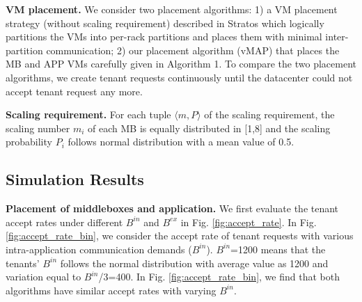 \documentclass[review]{elsarticle}
\begin{document}
\textbf{VM placement.} We consider two placement algorithms: 1) a VM placement strategy (without scaling requirement) described in Stratos \cite{stratos12} which logically partitions the VMs into per-rack partitions and places them with minimal inter-partition communication; 2) our placement algorithm (vMAP) that places the MB and APP VMs carefully given in Algorithm 1. To compare the two placement algorithms, we create tenant requests continuously until the datacenter could not accept tenant request any more.

\textbf{Scaling requirement.} For each tuple $\langle m, P\rangle$ of the scaling requirement, the scaling number $m_i$ of each MB is equally distributed in [1,8] and the scaling probability $P_i$ follows normal distribution with a mean value of 0.5. 
\subsection{Simulation Results}
\textbf{Placement of middleboxes and application.} We first evaluate the tenant accept rates under different $B^{in}$ and $B^{ex}$ in Fig. \ref{fig:accept_rate}.
In Fig. \ref{fig:accept_rate_bin}, we consider 
the accept rate of tenant requests with various intra-application communication demands ($B^{in}$). $B^{in}$=1200 means that the tenants’ $B^{in}$ follows the normal distribution with average value as 1200 and variation equal to $B^{in}$/3=400. In Fig. \ref{fig:accept_rate_bin}, we find that both algorithms have similar accept rates with varying $B^{in}$. 
\end{document}

